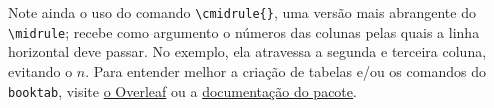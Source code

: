         Note ainda o uso do comando \verb|\cmidrule{}|, uma versão mais abrangente do \verb|\midrule|;
        recebe como argumento o números das colunas pelas quais a linha horizontal deve passar.
        No exemplo, ela atravessa a segunda e terceira coluna, evitando o $n$.
        Para entender melhor a criação de tabelas e/ou os comandos do {\tt booktab}, visite
        \href{https://www.overleaf.com/learn/latex/Tables}{o Overleaf} ou a 
        \href{https://linorg.usp.br/CTAN/macros/latex/contrib/booktabs/booktabs.pdf}{documentação do pacote}.
